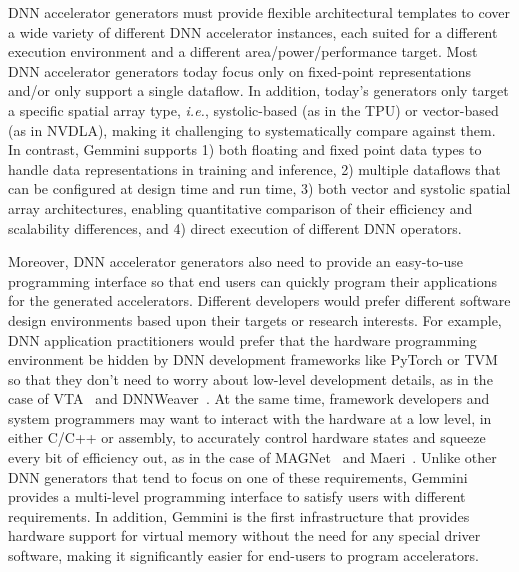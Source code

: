 DNN accelerator generators must provide flexible architectural templates to cover a wide variety of different DNN accelerator instances, each suited for a different execution environment and a different area/power/performance target. Most DNN accelerator generators today focus only on fixed-point representations and/or only support a single dataflow. In addition, today's generators only target a specific spatial array type, \textit{i.e.}, systolic-based (as in the TPU) or vector-based (as in NVDLA), making it challenging to systematically compare against them. In contrast, Gemmini supports 1) both floating and fixed point data types to handle data representations in training and inference, 2) multiple dataflows that can be configured at design time and run time, 3) both vector and systolic spatial array architectures, enabling quantitative comparison of their efficiency and scalability differences, and 4) direct execution of different DNN operators.
    
Moreover, DNN accelerator generators also need to provide an easy-to-use
programming interface so that end users can
quickly program their applications for the generated accelerators.
Different developers would prefer different software design environments based upon their targets or research interests.
For example, DNN application practitioners would prefer that the hardware
programming environment be hidden by DNN development frameworks like
PyTorch or TVM so that they don't need to worry about low-level development
details, as in the case of VTA~\cite{moreau2018} and DNNWeaver~\cite{dnnweaver}.
At the same time, framework developers and system programmers may want to
interact with the hardware at a low level, in either C/C++ or assembly, to
accurately control hardware states and squeeze every bit of efficiency out, as in the case of MAGNet~\cite{venkatesan2019magnet} and Maeri~\cite{maeri-asplos2018}.
Unlike other DNN generators that tend to focus on one of these
requirements, Gemmini provides a multi-level programming interface
to satisfy users with different requirements.
In addition, Gemmini is the first infrastructure that provides hardware support for virtual memory without the need for any special driver software, making it significantly easier for end-users to program accelerators.


